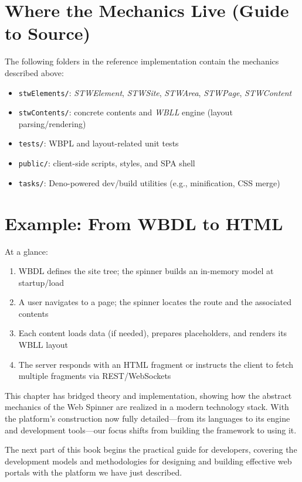 \section{Where the Mechanics Live (Guide to Source)}
The following folders in the reference implementation contain the mechanics described above:
\begin{itemize}
	\item \texttt{stwElements/}: \textit{STWElement}, \textit{STWSite}, \textit{STWArea}, \textit{STWPage}, \textit{STWContent}
	\item \texttt{stwContents/}: concrete contents and \textit{WBLL} engine (layout parsing/rendering)
	\item \texttt{tests/}: WBPL and layout-related unit tests
	\item \texttt{public/}: client-side scripts, styles, and SPA shell
	\item \texttt{tasks/}: Deno-powered dev/build utilities (e.g., minification, CSS merge)
\end{itemize}

\section{Example: From WBDL to HTML}
At a glance:
\begin{enumerate}
	\item WBDL defines the site tree; the spinner builds an in-memory model at startup/load
	\item A user navigates to a page; the spinner locates the route and the associated contents
	\item Each content loads data (if needed), prepares placeholders, and renders its WBLL layout
	\item The server responds with an HTML fragment or instructs the client to fetch multiple fragments via REST/WebSockets
\end{enumerate}

\noindent This chapter has bridged theory and implementation, showing how the abstract mechanics of the Web Spinner are realized in a modern technology stack. With the platform's construction now fully detailed—from its languages to its engine and development tools—our focus shifts from building the framework to using it.

The next part of this book begins the practical guide for developers, covering the development models and methodologies for designing and building effective web portals with the platform we have just described.
